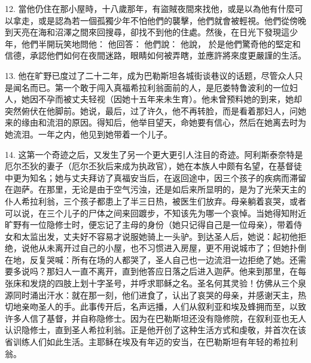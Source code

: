 12. 當他仍住在那小屋時，十八歲那年，有盜賊夜間來找他，或是以為他有什麼可以拿走，或是認為若一個孤獨少年不怕他們的襲擊，他們就會被輕視。他們從傍晚到天亮在海和沼澤之間來回搜尋，卻找不到他的住處。然後，在日光下發現這少年，他們半開玩笑地問他： 他回答： 他們說：  他說， 於是他們驚奇他的堅定和信德，承認他們如何在夜間迷路，眼睛如何被弄瞎，並應許將來度更嚴謹的生活。\par

13. 他在旷野已度过了二十二年，成为巴勒斯坦各城街谈巷议的话题，尽管众人只是闻名而已。第一个敢于闯入真福希拉利翁面前的人，是厄娄特鲁波利的一位妇人，她因不孕而被丈夫轻视（因她十五年来未生育）。他未曾预料她的到来，她却突然俯伏在他脚前。她说，最后，过了许久，他不再转脸，而是看着那妇人，问她来的缘由和流泪的原因。得知后，他举目望天，命她要有信心，然后在她离去时为她流泪。一年之内，他见到她带着一个儿子。\par

14. 这第一个奇迹之后，又发生了另一个更大更引人注目的奇迹。阿利斯泰奈特是厄尔丕狄的妻子（厄尔丕狄后来成为执政官），她在本族人中颇有名望，在基督徒中更为知名；她与丈夫拜访了真福安当后，在返回途中，因三个孩子的疾病而滞留在迦萨。在那里，无论是由于空气污浊，还是如后来所显明的，是为了光荣天主的仆人希拉利翁，三个孩子都患上了半三日热，被医生们放弃。母亲躺着哀哭，或者可以说，在三个儿子的尸体之间来回踱步，不知该先为哪一个哀悼。当她得知附近旷野有一位隐修士时，便忘记了主母的身份（她只记得自己是一位母亲），带着侍女和太监出发，丈夫好不容易才说服她骑上一头驴。到达圣人后，她说：起初他拒绝，说他从未离开过自己的小屋，也不习惯进入房屋，更不用说城市了；但她扑倒在地，反复哭喊：所有在场的人都哭了，圣人自己也一边流泪一边拒绝了她。还需要多说吗？那妇人一直不离开，直到他答应日落之后进入迦萨。他来到那里，在每张床和发烧的四肢上划十字圣号，并呼求耶稣之名。圣名何其灵验！仿佛从三个泉源同时涌出汗水：就在那一刻，他们进食了，认出了哀哭的母亲，并感谢天主，热切地亲吻圣人的手。此事传开后，名声远播，人们从叙利亚和埃及蜂拥而至，以致许多人信了基督，并自称隐修士。因为在巴勒斯坦还没有隐修院，在叙利亚也无人认识隐修士，直到圣人希拉利翁。正是他开创了这种生活方式和虔敬，并首次在该省训练人们如此生活。主耶稣在埃及有年迈的安当，在巴勒斯坦有年轻的希拉利翁。\par

